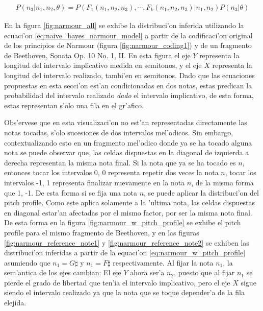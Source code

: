 \begin{align}
\label{eq:narmour_w_pitch_profile}
P(n_3 | n_1, n_2, \theta) = P(F_1(n_1, n_2, n_3), \cdots, F_k(n_1, n_2, n_3)|n_1, n_2) P(n_3|\theta)
\end{align}

En la figura \ref{fig:narmour_all} se exhibe la distribuci'on inferida utilizando la ecuaci'on \ref{eq:naive_bayes_narmour_model} a partir de la 
codificaci'on original de los principios de Narmour (figura \ref{fig:narmour_coding1}) y de un fragmento de Beethoven, Sonata Op. 10 No. 1, II. 
En esta figura el eje $Y$ representa la longitud del intervalo implicativo medida en semitonos, y el eje $X$ representa la longitud del intervalo 
realizado, tambi'en en semitonos. Dado que las ecuaciones propuestas en esta secci'on est'an condicionadas en dos notas, estas predican la probabilidad del intervalo 
realizado \emph{dado} el intervalo implicativo, de esta forma, estas representan s'olo una fila en el gr'afico.

Obs'ervese que en esta visualizaci'on no est'an representadas directamente las notas tocadas, s'olo sucesiones de dos intervalos mel'odicos. 
Sin embargo, contextualizando esto en un fragmento mel'odico donde ya se ha tocado alguna nota se puede observar que, las celdas dispuestas en la 
diagonal de izquierda a derecha representan la misma nota final. Si la nota que ya se ha tocado es $n$, entonces tocar los intervalos 0, 0 
representa repetir dos veces la nota $n$, tocar los intervalos -1, 1 representa finalizar nuevamente en la nota $n$, de la misma forma que 1, -1. 
De esta forma si se fija una nota $n$, se puede aplicar la distribuci'on del pitch profile. Como este aplica solamente a la 'ultima nota, las celdas
dispuestas en diagonal estar'an afectadas por el mismo factor, por ser la misma nota final. De esta forma en la figura \ref{fig:narmour_w_pitch_profile} 
se exhibe el pitch profile para el mismo fragmento de Beethoven, y en las figuras \ref{fig:narmour_reference_note1} y \ref{fig:narmour_reference_note2} se exhiben 
las distribuci'on inferidas a partir de la equaci'on \ref{eq:narmour_w_pitch_profile} asumiendo que $n_1=G\sharp$ y $n_1=F\sharp$ respectivamente. 
Al fijar la nota $n_1$, la sem'antica de los ejes cambian: El eje $Y$ ahora ser'a $n_2$, puesto que al fijar $n_1$ se pierde el grado de 
libertad que ten'ia el intervalo implicativo, pero el eje $X$ sigue siendo el intervalo realizado ya que la nota que se toque depender'a de la fila elejida.
\begin{imagen}
    \width{10cm}
\end{imagen}

